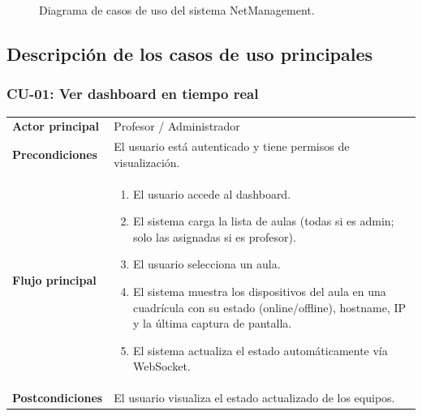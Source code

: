 \documentclass[12pt, a4paper, twoside]{article}
\begin{document}
\begin{figure}[H]
{
}
\caption{Diagrama de casos de uso del sistema NetManagement.}
\label{fig:casos-uso}
\end{figure}

\subsection{Descripción de los casos de uso principales}

\subsubsection{CU-01: Ver dashboard en tiempo real}

\begin{tabularx}{\textwidth}{lX}
  \toprule
  \textbf{Actor principal} & Profesor / Administrador \\
  \textbf{Precondiciones}  & El usuario está autenticado y tiene permisos de visualización. \\
  \textbf{Flujo principal}  &
  \begin{enumerate}[nosep]
    \item El usuario accede al dashboard.
    \item El sistema carga la lista de aulas (todas si es admin; solo las asignadas si es profesor).
    \item El usuario selecciona un aula.
    \item El sistema muestra los dispositivos del aula en una cuadrícula con su estado (online/offline), hostname, IP y la última captura de pantalla.
    \item El sistema actualiza el estado automáticamente vía WebSocket.
  \end{enumerate} \\
  \textbf{Postcondiciones} & El usuario visualiza el estado actualizado de los equipos. \\
  \bottomrule
\end{tabularx}
\end{document}
